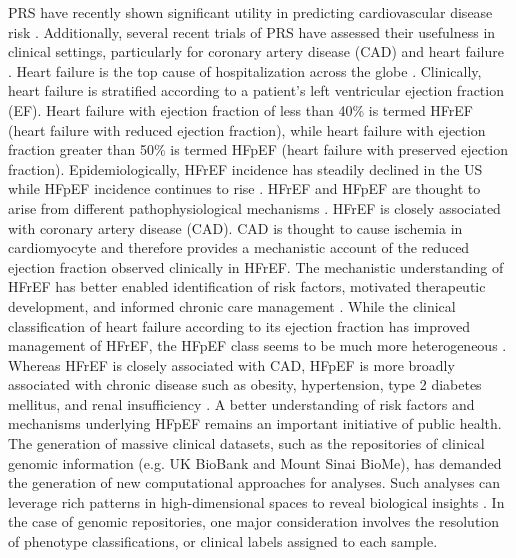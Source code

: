 \documentclass[11pt]{article}  %
\begin{document}
PRS have recently shown significant utility in predicting cardiovascular disease risk \cite{sun_polygenic_2021}. Additionally, several recent trials of PRS have assessed their usefulness in clinical settings, particularly for coronary artery disease (CAD) and heart failure \cite{levin_michael_g_polygenic_2020}. Heart failure is the top cause of hospitalization across the globe \cite{simmonds_cellular_2020}. Clinically, heart failure is stratified according to a patient’s left ventricular ejection fraction (EF). Heart failure with ejection fraction of less than 40\% is termed HFrEF (heart failure with reduced ejection fraction), while heart failure with ejection fraction greater than 50\% is termed HFpEF (heart failure with preserved ejection fraction). Epidemiologically, HFrEF incidence has steadily declined in the US while HFpEF incidence continues to rise \cite{tsao_temporal_2018}.
HFrEF and HFpEF are thought to arise from different pathophysiological mechanisms \cite{kitzman_pathophysiological_2002}. HFrEF is closely associated with coronary artery disease (CAD). CAD is thought to cause ischemia in cardiomyocyte and therefore provides a mechanistic account of the reduced ejection fraction observed clinically in HFrEF. The mechanistic understanding of HFrEF has better enabled identification of risk factors, motivated therapeutic development, and informed chronic care management \cite{kass_david_a_what_2004}. 
While the clinical classification of heart failure according to its ejection fraction has improved management of HFrEF, the HFpEF class seems to be much more heterogeneous \cite{kass_david_a_what_2004}. Whereas HFrEF is closely associated with CAD, HFpEF is more broadly associated with chronic disease such as obesity, hypertension, type 2 diabetes mellitus, and renal insufficiency \cite{ergatoudes_non-cardiac_2019}. A better understanding of risk factors and mechanisms underlying HFpEF remains an important initiative of public health.
The generation of massive clinical datasets, such as the repositories of clinical genomic information (e.g. UK BioBank and Mount Sinai BioMe), has demanded the generation of new computational approaches for analyses. Such analyses can leverage rich patterns in high-dimensional spaces to reveal biological insights \cite{nicolau_topology_2011-1}. In the case of genomic repositories, one major consideration involves the resolution of phenotype classifications, or clinical labels assigned to each sample. 
\end{document}

